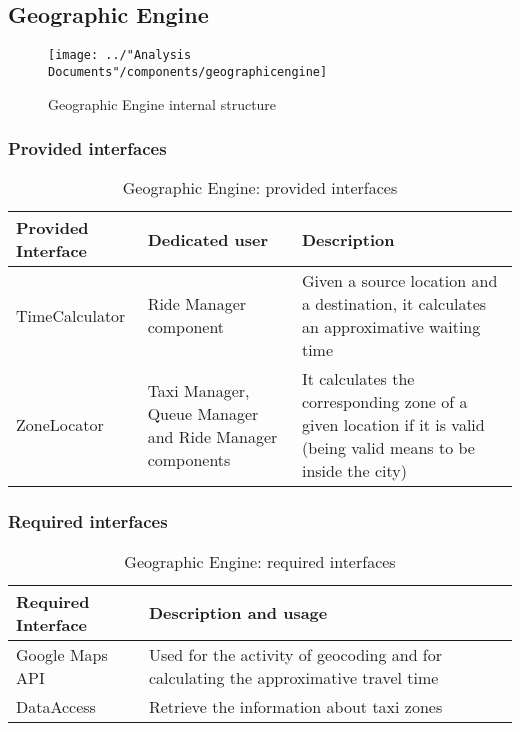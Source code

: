 \subsection{Geographic Engine}
\begin{figure}[H]
	\centering
	\texttt{[image: ../"Analysis Documents"/components/geographicengine]}
	\label{fig:geographicengine}
	\caption{Geographic Engine internal structure}
\end{figure}
\subsubsection{Provided interfaces}
\begin{table}[H]
	\begin{longtable}{| p{} | p{} | p{} |}
		\hline
		\textbf{Provided Interface} & \textbf{Dedicated user} & \textbf{Description} \\ \hline
		TimeCalculator & Ride Manager component & Given a source location and a destination, it calculates an approximative waiting time \\ \hline
		ZoneLocator & Taxi Manager, Queue Manager and Ride Manager components & It calculates the corresponding zone of a given location if it is valid (being valid means to be inside the city) \\ \hline
	\end{longtable}
	\caption{Geographic Engine: provided interfaces}
	\label{tab:geographicengine:providedInterfaces}
\end{table}
\subsubsection{Required interfaces}
\begin{table}[H]
	\begin{longtable}{| l | p{} |}
		\hline
		\textbf{Required Interface} & \textbf{Description and usage} \\ \hline
		Google Maps API & Used for the activity of geocoding and for calculating the approximative travel time \\ \hline
		DataAccess & Retrieve the information about taxi zones \\ \hline
	\end{longtable}
	\caption{Geographic Engine: required interfaces}
	\label{tab:geographicengine:requiredInterfaces}
\end{table}
